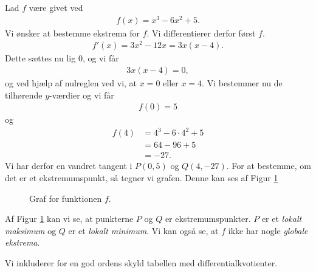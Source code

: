 \begin{exa}
	Lad $f$ være givet ved
	\begin{align*}
		f(x) = x^3-6x^2+5.
	\end{align*}
	Vi ønsker at bestemme ekstrema for $f$. Vi differentierer derfor først $f$.
	\begin{align*}
		f'(x) = 3x^2-12x = 3x(x-4).
	\end{align*}
	Dette sættes nu lig $0$, og vi får
	\begin{align*}
		3x(x-4) = 0, 
	\end{align*}
	og ved hjælp af nulreglen ved vi, at $x=0$ eller $x = 4$. Vi bestemmer nu de tilhørende $y$-værdier og vi får
	\begin{align*}
		f(0) = 5
	\end{align*}
	og 
	\begin{align*}
		f(4) &= 4^3 - 6\cdot 4^2+5\\
		&= 64-96+5\\
		&= -27.
	\end{align*}
	Vi har derfor en vandret tangent i $P(0,5)$ og $Q(4,-27)$. For at bestemme, om det er et ekstremumspunkt, så tegner vi grafen. Denne kan ses af Figur \ref{fig:ekstrema}
	\begin{figure}[H]
		\centering
		\caption{Graf for funktionen $f$.}
		\label{fig:ekstrema}
	\end{figure}
\end{exa}
Af Figur \ref{fig:ekstrema} kan vi se, at punkterne $P$ og $Q$ er ekstremumspunkter. $P$ er et \textit{lokalt maksimum} og $Q$ er et \textit{lokalt minimum}. Vi kan også se, at $f$ ikke har nogle 
\textit{globale ekstrema}.

Vi inkluderer for en god ordens skyld tabellen med differentialkvotienter.

